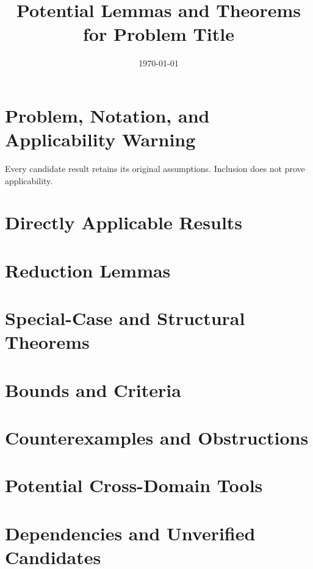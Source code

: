 \documentclass[11pt]{article}
\title{Potential Lemmas and Theorems for Problem Title}
\author{}
\date{\today}
\theoremstyle{definition}
\begin{document}
\maketitle
\section{Problem, Notation, and Applicability Warning}
Every candidate result retains its original assumptions. Inclusion does not prove applicability.
\section{Directly Applicable Results}
\section{Reduction Lemmas}
\section{Special-Case and Structural Theorems}
\section{Bounds and Criteria}
\section{Counterexamples and Obstructions}
\section{Potential Cross-Domain Tools}
\section{Dependencies and Unverified Candidates}


\end{document}
